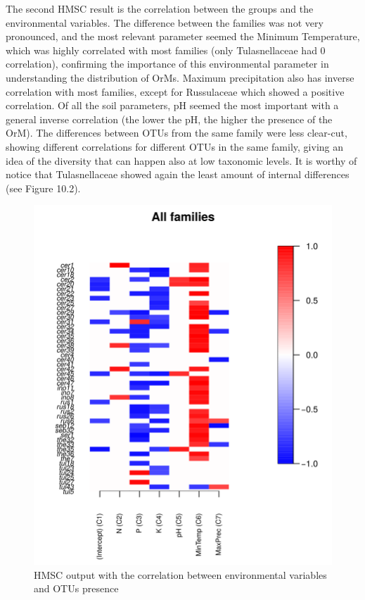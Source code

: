 The second HMSC result is the correlation between the groups and the environmental variables.
The difference between the families was not very pronounced, and the most relevant parameter seemed the Minimum Temperature, which was highly correlated with most families (only Tulasnellaceae had 0 correlation), confirming the importance of this environmental parameter in understanding the distribution of OrMs. Maximum precipitation also has inverse correlation with most families, except for Russulaceae which showed a positive correlation. Of all the soil parameters, pH seemed the most important with a general inverse correlation (the lower the pH, the higher the presence of the OrM).
The differences between OTUs from the same family were less clear-cut, showing different correlations for different OTUs in the same family, giving an idea of the diversity that can happen also at low taxonomic levels.
It is worthy of notice that Tulasnellaceae showed again the least amount of internal differences (see Figure 10.2).

\begin{figure}[htbp]
\centering
\includegraphics[keepaspectratio,width=\textwidth,height=0.75\textheight]{images/envVar.png}
\caption{HMSC output with the correlation between environmental variables and OTUs presence}
\end{figure}

